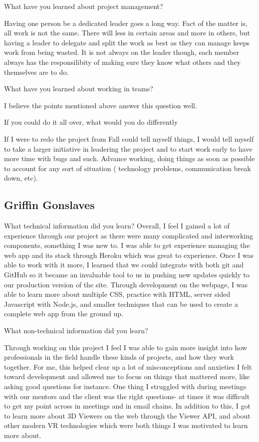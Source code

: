 \documentclass[letterpaper, 10pt, draftclsnofoot, compsoc, onecolumn]{IEEEtran}
\begin{document}
What have you learned about project management?

Having one person be a dedicated leader goes a long way. Fact of the matter is, all work is not the same. There will less in certain areas and more in others, but having a leader to delegate and split the work as best as they can manage keeps work from being wasted. It is not always on the leader though, each member always has the responsilibity of making sure they know what others and they themselves are to do.

What have you learned about working in teams?

I believe the points mentioned above answer this question well.

If you could do it all over, what would you do differently

If I were to redo the project from Fall could tell myself things, I would tell myself to take a larger initiative in leadering the project and to start work early to have more time with bugs and such. Advance working, doing things as soon as possible to account for any sort of situation ( technology problems, communication break down, etc).

\subsection{Griffin Gonslaves}
What technical information did you learn?
Overall, I feel I gained a lot of experience through our project as there were many complicated and interworking components, something I was new to. I was able to get experience managing the web app and its stack through Heroku which was great to experience. Once I was able to work with it more, I learned that we could integrate with both git and GitHub so it became an invaluable tool to us in pushing new updates quickly to our production version of the site. Through development on the webpage, I was able to learn more about multiple CSS, practice with HTML, server sided Javascript with Node.js, and smaller techniques that can be used to create a complete web app from the ground up.  

What non-technical information did you learn?

Through working on this project I feel I was able to gain more insight into how professionals in the field handle these kinds of projects, and how they work together. For me, this helped clear up a lot of misconceptions and anxieties I felt toward development and allowed me to focus on things that mattered more, like asking good questions for instance. One thing I struggled with during meetings with our mentors and the client was the right questions- at times it was difficult to get my point across in meetings and in email chains. In addition to this, I got to learn more about 3D Viewers on the web through the Viewer API, and about other modern VR technologies which were both things I was motivated to learn more about.
\end{document}
